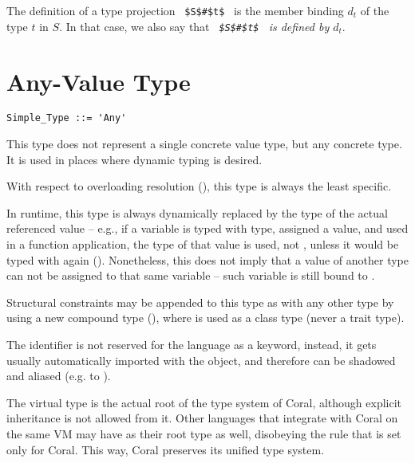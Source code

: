\begin{enumerate}
The definition of a type projection ~\lstinline!$S$#$t$!~ is the member binding $d_t$ of the type $t$ in $S$. In that case, we also say that {\em ~\lstinline!$S$#$t$!~ is defined by $d_t$}. 

\end{enumerate}







\section{Any-Value Type}
\label{sec:any-value-type}

\syntax\begin{lstlisting}
Simple_Type ::= 'Any'
\end{lstlisting}

This type does not represent a single concrete value type, but any concrete type. It is used in places where dynamic typing is desired. 

With respect to overloading resolution (), this type is always the least specific. 

In runtime, this type is always dynamically replaced by the type of the actual referenced value -- e.g., if a variable is typed with  type, assigned a value, and used in a function application, the type of that value is used, not , unless it would be typed with  again (). Nonetheless, this does not imply that a value of another type can not be assigned to that same variable -- such variable is still bound to . 

Structural constraints may be appended to this type as with any other type by using a new compound type (), where  is used as a class type (never a trait type).

The  identifier is not reserved for the language as a keyword, instead, it gets usually automatically imported with the  object, and therefore can be shadowed and aliased (e.g. to ). 

The  virtual type is the actual root of the type system of Coral, although explicit inheritance is not allowed from it. Other languages that integrate with Coral on the same VM may have  as their root type as well, disobeying the rule that is set only for Coral. This way, Coral preserves its unified type system. 





